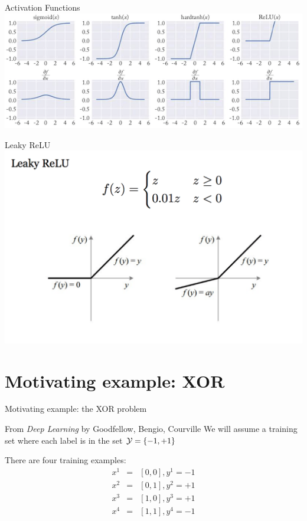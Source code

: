 \begin{frame}{Activation Functions}
\centering
\includegraphics[scale=0.4]{figures/ff/activationfns.png}
\end{frame}

\begin{frame}{Leaky ReLU}
\centering
\includegraphics[scale=0.3]{figures/ff/leakyrelu.png}
\end{frame}


\section{Motivating example: XOR}
\frame{\tableofcontents[currentsection]}

\begin{frame}{Motivating example: the XOR problem}
\begin{block}{From \textit{Deep Learning} by Goodfellow, Bengio, Courville}
We will assume a training set where each label is in the set ${\cal Y} = \{ -1, +1 \}$

There are four training examples:
\begin{eqnarray*}
x^1 &=& [0,0], y^1 = -1\\
x^2 &=& [0,1], y^2 = +1 \\
x^3 &=& [1,0], y^3 = +1\\
x^4 &=& [1,1], y^4 = -1
\end{eqnarray*}
\end{block}
\end{frame}

